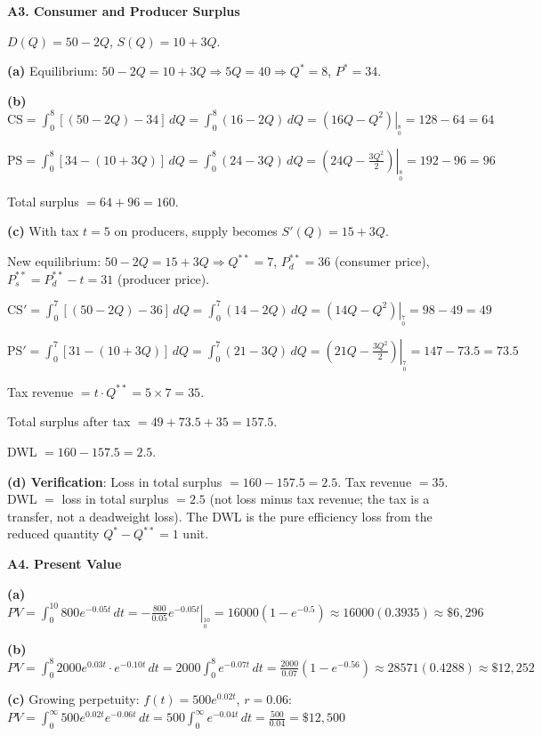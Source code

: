 \documentclass[12pt, a4paper]{article}
\theoremstyle{definition}
\newcommand{\dd}[1]{\,d#1}
\newcommand{\eval}[2]{\left.#1\right|_{#2}}
\newcommand{\CS}{\text{CS}}
\newcommand{\PS}{\text{PS}}
\begin{document}
\begin{solbox}
\textbf{A3. Consumer and Producer Surplus}

$D(Q)=50-2Q$, $S(Q)=10+3Q$.

\textbf{(a)} Equilibrium: $50-2Q=10+3Q \Rightarrow 5Q=40 \Rightarrow Q^*=8$, $P^*=34$.

\textbf{(b)}
$\CS = \displaystyle\int_0^8[(50-2Q)-34]\dd{Q} = \int_0^8(16-2Q)\dd{Q}
= \eval{(16Q-Q^2)}{_0^8} = 128-64 = 64$

$\PS = \displaystyle\int_0^8[34-(10+3Q)]\dd{Q} = \int_0^8(24-3Q)\dd{Q}
= \eval{(24Q-\frac{3Q^2}{2})}{_0^8} = 192-96 = 96$

Total surplus $= 64+96 = 160$.

\textbf{(c)} With tax $t=5$ on producers, supply becomes $S'(Q)=15+3Q$.

New equilibrium: $50-2Q=15+3Q \Rightarrow Q^{**}=7$, $P_d^{**}=36$
(consumer price), $P_s^{**}=P_d^{**}-t=31$ (producer price).

$\CS' = \displaystyle\int_0^7[(50-2Q)-36]\dd{Q} = \int_0^7(14-2Q)\dd{Q}
= \eval{(14Q-Q^2)}{_0^7} = 98-49 = 49$

$\PS' = \displaystyle\int_0^7[31-(10+3Q)]\dd{Q} = \int_0^7(21-3Q)\dd{Q}
= \eval{(21Q-\frac{3Q^2}{2})}{_0^7} = 147-73.5 = 73.5$

Tax revenue $= t\cdot Q^{**} = 5\times 7 = 35$.

Total surplus after tax $= 49+73.5+35 = 157.5$.

DWL $= 160-157.5 = 2.5$.

\textbf{(d) Verification}:
Loss in total surplus $=160-157.5=2.5$. Tax revenue $=35$.
DWL $=$ loss in total surplus $=2.5$ (not loss minus tax revenue; the tax is
a transfer, not a deadweight loss). The DWL is the pure efficiency loss from
the reduced quantity $Q^*-Q^{**}=1$ unit. \checkmark
\end{solbox}

\begin{solbox}
\textbf{A4. Present Value}

\textbf{(a)} $PV = \displaystyle\int_0^{10}800e^{-0.05t}\dd{t}
= \eval{-\frac{800}{0.05}e^{-0.05t}}{_0^{10}}
= 16000(1-e^{-0.5})
\approx 16000(0.3935) \approx \$6{,}296$

\textbf{(b)} $PV = \displaystyle\int_0^8 2000e^{0.03t}\cdot e^{-0.10t}\dd{t}
= 2000\int_0^8 e^{-0.07t}\dd{t}
= \frac{2000}{0.07}(1-e^{-0.56})
\approx 28571(0.4288)\approx \$12{,}252$

\textbf{(c)} Growing perpetuity: $f(t)=500e^{0.02t}$, $r=0.06$:
$PV = \displaystyle\int_0^\infty 500e^{0.02t}e^{-0.06t}\dd{t}
= 500\int_0^\infty e^{-0.04t}\dd{t}
= \frac{500}{0.04} = \$12{,}500$
\end{solbox}
\end{document}
